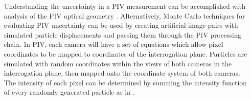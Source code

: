 Understanding the uncertainty in a PIV measurement can be accomplished with 
analysis of the PIV optical geometry \cite{lawson1997b}. Alternatively, Monte 
Carlo techniques for evaluating PIV uncertainty can be used by creating 
artificial image pairs with simulated particle displacements and passing them 
through the PIV processing chain. In PIV, each camera will have a set of 
equations which allow pixel coordinates to be mapped to coordinates of the 
interrogation plane. Particles are simulated with random coordinates within the 
views of both cameras in the interrogation plane, then mapped onto the 
coordinate system of both cameras. The intensity of each pixel can be 
determined by summing the intensity function of every randomly generated 
particle as in  \cite{adeyinka2005,fouras2007}.




